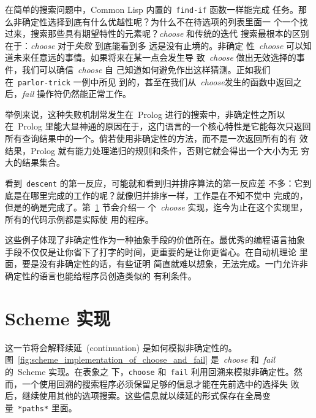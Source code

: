 在简单的搜索问题中，Common Lisp 内置的~\texttt{find-if} 函数一样能完成
任务。那么非确定性选择到底有什么优越性呢？为什么不在待选项的列表里面一
个一个找过来，搜索那些具有期望特性的元素呢？\emph{choose} 和传统的迭代
搜索最根本的区别在于：\emph{choose} 对于\emph{失败} 到底能看到多
远是没有止境的。非确定
性~\emph{choose} 可以知道未来任意远的事情。如果将来在某一点会发生导
致~\emph{choose} 做出无效选择的事件，我们可以确信~\emph{choose} 自
己知道如何避免作出这样猜测。正如我们在~\texttt{parlor-trick} 一例中所见
到的，甚至在我们从~\emph{choose}发生的函数中返回之后，\emph{fail}
操作符仍然能正常工作。

举例来说，这种失败机制常发生在~Prolog 进行的搜索中，非确定性之所以
在~Prolog 里能大显神通的原因在于，这门语言的一个核心特性是它能每次只返回
所有查询结果中的一个。倘若使用非确定性的方法，而不是一次返回所有的有
效结果，Prolog 就有能力处理递归的规则和条件，否则它就会得出一个大小为无
穷大的结果集合。

看到~\texttt{descent} 的第一反应，可能就和看到归并排序算法的第一反应差
不多：它到底是在哪里完成的工作的呢？就像归并排序一样，工作是在不知不觉中
完成的，但是的确是完成了。第~\ref{sec:scheme_implementation} 节会介绍一
个~\emph{choose} 实现，迄今为止在这个实现里，所有的代码示例都是实际使
用的程序。

这些例子体现了非确定性作为一种抽象手段的价值所在。最优秀的编程语言抽象
手段不仅仅是让你省下了打字的时间，更重要的是让你更省心。在自动机理论
里面，要是没有非确定性的话，有些证明
简直就难以想象，无法完成。一门允许非确定性的语言也能给程序员创造类似的
有利条件。

\section{Scheme 实现}
\label{sec:scheme_implementation}
这一节将会解释续延~(continuation) 是如何模拟非确定性的。
图~\ref{fig:scheme_implementation_of_choose_and_fail} 
是~\emph{choose} 和~\emph{fail} 的~Scheme 实现。在表象之
下，\texttt{choose} 和~\texttt{fail} 利用回溯来模拟非确定性。然
而，一个使用回溯的搜索程序必须保留足够的信息才能在先前选中的选择失
败后，继续使用其他的选项搜索。这些信息就以续延的形式保存在全局变
量~\texttt{*paths*} 里面。


